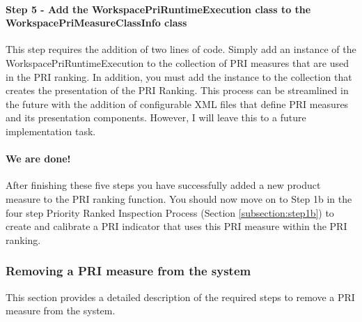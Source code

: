


\paragraph{Step 5 - Add the WorkspacePriRuntimeExecution class to the
  WorkspacePriMeasureClassInfo class} This step requires the addition of
two lines of code. Simply add an instance of the
WorkspacePriRuntimeExecution to the collection of PRI measures that are
used in the PRI ranking. In addition, you must add the instance to the
collection that creates the presentation of the PRI Ranking. This process
can be streamlined in the future with the addition of configurable XML
files that define PRI measures and its presentation components. However, I
will leave this to a future implementation task.

\paragraph{We are done!} 
After finishing these five steps you have successfully added a new product
measure to the PRI ranking function. You should now move on to Step 1b in
the four step Priority Ranked Inspection Process (Section
\ref{subsection:step1b}) to create and calibrate a PRI indicator that uses
this PRI measure within the PRI ranking.


\subsubsection{Removing a PRI measure from the system}
\label{subsubsection:removePriMeasure}
This section provides a detailed description of the required steps to
remove a PRI measure from the system.


